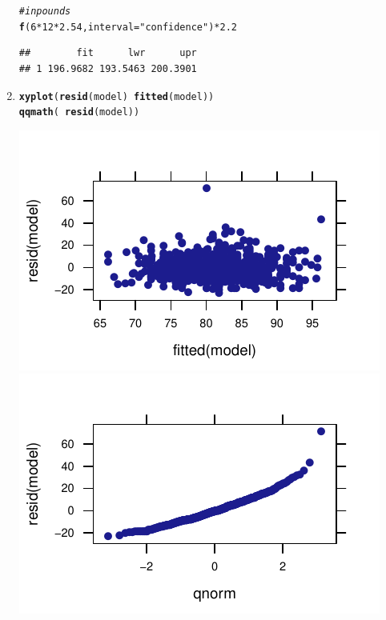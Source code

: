 \documentclass[twoside]{book}\usepackage[]{graphicx}\usepackage[]{xcolor}
\makeatletter
\def\maxwidth{ %
  \ifdim\Gin@nat@width>\linewidth
    \linewidth
  \else
    \Gin@nat@width
  \fi
}
\newcommand{\hlnum}[1]{\textcolor[rgb]{0.686,0.059,0.569}{#1}}%
\newcommand{\hlstr}[1]{\textcolor[rgb]{0.192,0.494,0.8}{#1}}%
\newcommand{\hlcom}[1]{\textcolor[rgb]{0.678,0.584,0.686}{\textit{#1}}}%
\newcommand{\hlopt}[1]{\textcolor[rgb]{0,0,0}{#1}}%
\newcommand{\hlstd}[1]{\textcolor[rgb]{0.345,0.345,0.345}{#1}}%
\newcommand{\hlkwc}[1]{\textcolor[rgb]{0.333,0.667,0.333}{#1}}%
\newcommand{\hlkwd}[1]{\textcolor[rgb]{0.737,0.353,0.396}{\textbf{#1}}}%
\newenvironment{kframe}{%
 \def\at@end@of@kframe{}%
 \ifinner\ifhmode%
  \def\at@end@of@kframe{\end{minipage}}%
  \begin{minipage}{\columnwidth}%
 \fi\fi%
 \def\FrameCommand##1{\hskip\@totalleftmargin \hskip-\fboxsep
 \colorbox{shadecolor}{##1}\hskip-\fboxsep
     \hskip-\linewidth \hskip-\@totalleftmargin \hskip\columnwidth}%
 \MakeFramed {\advance\hsize-\width
   \@totalleftmargin\z@ \linewidth\hsize
   \@setminipage}}%
 {\par\unskip\endMakeFramed%
 \at@end@of@kframe}
\newenvironment{knitrout}{}{} %
\makeatother
\begin{document}
\begin{solution}
\begin{enumerate}
\begin{knitrout}
\begin{kframe}
\begin{verbatim}
\end{verbatim}
\begin{alltt}
\hlcom{# in pounds}
\hlkwd{f}\hlstd{(} \hlnum{6} \hlopt{*} \hlnum{12} \hlopt{*} \hlnum{2.54}\hlstd{,} \hlkwc{interval}\hlstd{=}\hlstr{"confidence"} \hlstd{)} \hlopt{*} \hlnum{2.2}
\end{alltt}
\begin{verbatim}
##        fit      lwr      upr
## 1 196.9682 193.5463 200.3901
\end{verbatim}
\end{kframe}
\end{knitrout}
		\item
\begin{knitrout}
\color{fgcolor}\begin{kframe}
\begin{alltt}
\hlkwd{xyplot}\hlstd{(} \hlkwd{resid}\hlstd{(model)} \hlopt{~} \hlkwd{fitted}\hlstd{(model) )}
\hlkwd{qqmath}\hlstd{(} \hlopt{~} \hlkwd{resid}\hlstd{(model) )}
\end{alltt}
\end{kframe}

{\centering \includegraphics[width=\maxwidth]{figures/fig-unnamed-chunk-193-1} 
\includegraphics[width=\maxwidth]{figures/fig-unnamed-chunk-193-2} 

}
\end{knitrout}
\end{enumerate}
\end{solution}
\end{document}

